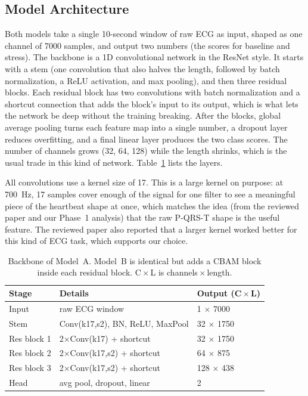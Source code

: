 \documentclass[conference]{IEEEtran}
\begin{document}
\subsection{Model Architecture}
Both models take a single 10-second window of raw ECG as input, shaped as one
channel of 7000 samples, and output two numbers (the scores for baseline and
stress). The backbone is a 1D convolutional network in the ResNet style. It
starts with a stem (one convolution that also halves the length, followed by
batch normalization, a ReLU activation, and max pooling), and then three
residual blocks. Each residual block has two convolutions with batch
normalization and a shortcut connection that adds the block's input to its
output, which is what lets the network be deep without the training breaking.
After the blocks, global average pooling turns each feature map into a single
number, a dropout layer reduces overfitting, and a final linear layer produces
the two class scores. The number of channels grows (32, 64, 128) while the
length shrinks, which is the usual trade in this kind of network.
Table~\ref{tab:arch} lists the layers.

All convolutions use a kernel size of 17. This is a large kernel on purpose: at
700~Hz, 17 samples cover enough of the signal for one filter to see a meaningful
piece of the heartbeat shape at once, which matches the idea (from the reviewed
paper \cite{reviewed} and our Phase~1 analysis) that the raw P-QRS-T shape is the
useful feature. The reviewed paper also reported that a larger kernel worked
better for this kind of ECG task, which supports our choice.

\begin{table}[t]
\caption{Backbone of Model~A. Model~B is identical but adds a CBAM block inside
each residual block. C\,$\times$\,L is channels\,$\times$\,length.}
\label{tab:arch}
\centering
\footnotesize
\begin{tabular}{|l|l|l|}
\hline
\textbf{Stage} & \textbf{Details} & \textbf{Output (C\,$\times$\,L)} \\
\hline
Input & raw ECG window & 1 $\times$ 7000 \\
\hline
Stem & Conv(k17,s2), BN, ReLU, MaxPool & 32 $\times$ 1750 \\
\hline
Res block 1 & 2$\times$Conv(k17) + shortcut & 32 $\times$ 1750 \\
\hline
Res block 2 & 2$\times$Conv(k17,s2) + shortcut & 64 $\times$ 875 \\
\hline
Res block 3 & 2$\times$Conv(k17,s2) + shortcut & 128 $\times$ 438 \\
\hline
Head & avg pool, dropout, linear & 2 \\
\hline
\end{tabular}
\end{table}
\end{document}
